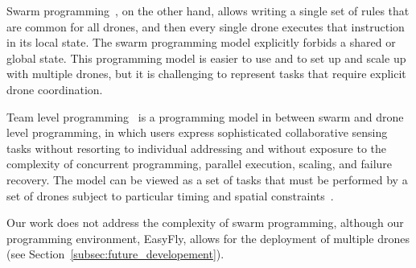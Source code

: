 Swarm programming~\cite{quigley2009ros}, on the other hand, allows writing a single set of rules that are common for all drones, and then every single drone 
executes that instruction in its local state. The swarm programming model explicitly forbids a shared or global state.
This programming model is easier to use and to set up and scale up with multiple drones, but it is challenging to represent tasks that require explicit drone coordination.

Team level programming~\cite{mottola2014team} is a programming model in between swarm and drone level programming, 
in which users express sophisticated collaborative sensing tasks without resorting to individual addressing 
and without exposure to the complexity of concurrent programming, parallel execution, scaling, and failure recovery.
The model can be viewed as a set of tasks that must be performed by a set of drones subject to particular timing and spatial constraints~\cite{mottola2014team}.

Our work does not address the complexity of swarm programming, although our programming environment, EasyFly, allows for the deployment of multiple drones (see Section~\ref{subsec:future_developement}).